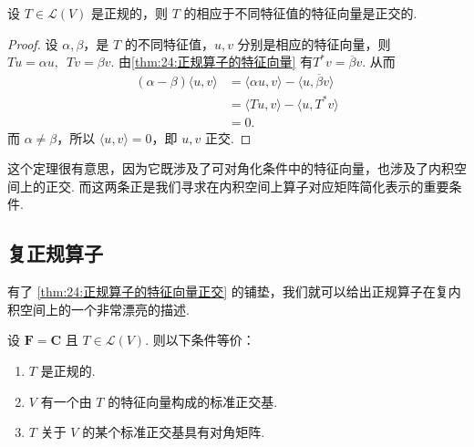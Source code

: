 \begin{theorem} \label{thm:24:正规算子的特征向量正交}
    设 $ T \in \mathcal{L}(V) $ 是正规的，则 $ T $ 的相应于不同特征值的特征向量是正交的.
\end{theorem}

\begin{proof}
    设 $ \alpha, \beta $，是 $ T $ 的不同特征值，$ u, v $ 分别是相应的特征向量，则 $ Tu = \alpha u,\enspace Tv = \beta v $. 由\autoref{thm:24:正规算子的特征向量} 有$ T^*v = \overline{\beta} v $. 从而
    \begin{align*}
        (\alpha - \beta)\langle u, v \rangle
         & = \langle \alpha u, v \rangle - \langle u, \overline{\beta}v \rangle \\
         & = \langle Tu, v \rangle - \langle u, T^*v \rangle                    \\
         & = 0.
    \end{align*}
    而 $ \alpha \neq \beta $，所以 $ \langle u, v \rangle = 0 $，即 $ u, v $ 正交.
\end{proof}

这个定理很有意思，因为它既涉及了可对角化条件中的特征向量，也涉及了内积空间上的正交. 而这两条正是我们寻求在内积空间上算子对应矩阵简化表示的重要条件.

\subsection{复正规算子}

有了 \autoref{thm:24:正规算子的特征向量正交} 的铺垫，我们就可以给出正规算子在复内积空间上的一个非常漂亮的描述.

\begin{theorem}[复谱定理] \label{thm:24:复谱定理} 
    设 $ \mathbf{F} = \mathbf{C} $ 且 $ T \in \mathcal{L}(V) $. 则以下条件等价：
    \begin{enumerate}
        \item \label{item:24:复谱定理:1}
              $ T $ 是正规的.

        \item \label{item:24:复谱定理:2}
              $ V $ 有一个由 $ T $ 的特征向量构成的标准正交基.

        \item \label{item:24:复谱定理:3}
              $ T $ 关于 $ V $ 的某个标准正交基具有对角矩阵.
    \end{enumerate}
\end{theorem}

